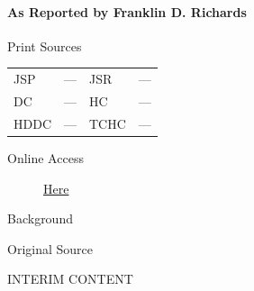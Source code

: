			\paragraph{As Reported by Franklin D. Richards}
				\label{EMS-1843-JS-16-JUL-1843-FR}
			
				\begin{description}
					\item[Print Sources]
				\end{description}

					\begin{tabular}{p{0.5in}p{1in}p{0.5in}p{1in}}
					JSP	 	& ---		& JSR 		& --- \\
					DC	 	& ---		& HC 		& --- \\
					HDDC 	& ---		& TCHC 		& --- \\
					\end{tabular}
				
				\begin{description}
					\item[Online Access] \href{https://www.josephsmithpapers.org/paper-summary/discourse-16-july-1843-as-reported-by-franklin-d-richards/1}{Here}
				\end{description}
				
				\begin{description}
					\item[Background]
				\end{description}
				
				
				\begin{description}
					\item[Original Source]
				\end{description}
				
					INTERIM CONTENT
				
				
